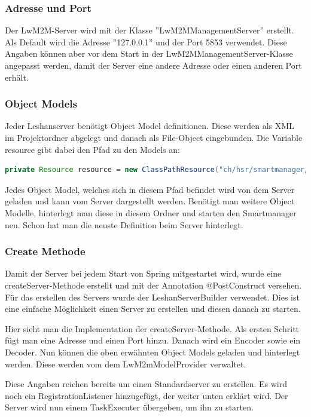 \subsubsection{Adresse und Port}
Der LwM2M-Server wird mit der Klasse ''LwM2MManagementServer'' erstellt. Als Default wird die Adresse ''127.0.0.1'' und der Port 5853 verwendet. Diese Angaben können aber vor dem Start in der LwM2MManagementServer-Klasse angepasst werden, damit der Server eine andere Adresse oder einen anderen Port erhält.
\subsubsection{Object Models}
Jeder Leshanserver benötigt Object Model definitionen. Diese werden als XML im Projektordner abgelegt und danach als File-Object eingebunden.
Die Variable resource gibt dabei den Pfad zu den Models an:
\begin{lstlisting}[language=java]
private Resource resource = new ClassPathResource("ch/hsr/smartmanager/resources/models/");
\end{lstlisting}
Jedes Object Model, welches sich in diesem Pfad befindet wird von dem Server geladen und kann vom Server dargestellt werden. Benötigt man weitere Object Modelle, hinterlegt man diese in diesem Ordner und starten den Smartmanager neu. Schon hat man die neuste Definition beim Server hinterlegt.
\subsubsection{Create Methode}
Damit der Server bei jedem Start von Spring mitgestartet wird, wurde eine createServer-Methode erstellt und mit der Annotation @PostConstruct versehen. Für das erstellen des Servers wurde der LeshanServerBuilder verwendet. Dies ist eine einfache Möglichkeit einen Server zu erstellen und diesen danach zu starten.

Hier sieht man die Implementation der createServer-Methode. Als ersten Schritt fügt man eine Adresse und einen Port hinzu. Danach wird ein Encoder sowie ein Decoder. Nun können die oben erwähnten Object Models geladen und hinterlegt werden. Diese werden vom dem LwM2mModelProvider verwaltet.

Diese Angaben reichen bereits um einen Standardserver zu erstellen. Es wird noch ein RegistrationListener hinzugefügt, der weiter unten erklärt wird. Der Server wird nun einem TaskExecuter übergeben, um ihn zu starten.

